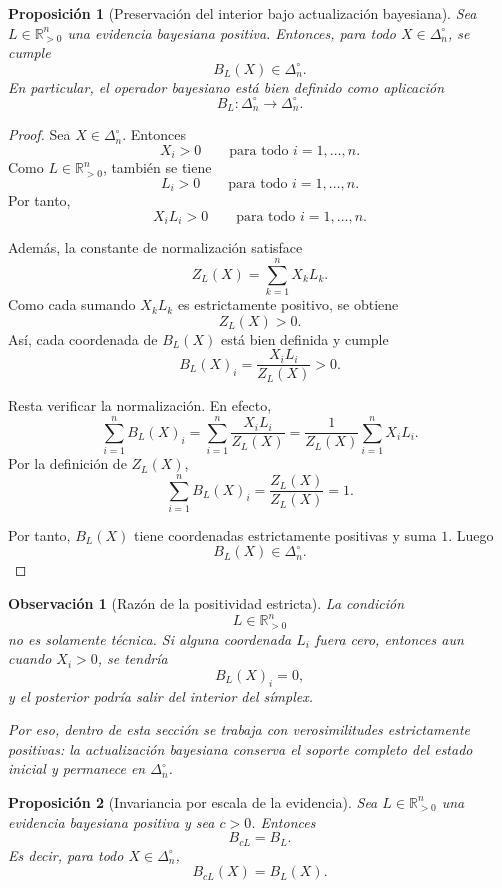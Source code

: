 \documentclass[12pt]{article}
\newtheorem{proposicion}{Proposición}[section]
\newtheorem{observacion}{Observación}[section]
\begin{document}
\begin{proposicion}[Preservación del interior bajo actualización bayesiana]
Sea \(L\in\mathbb{R}_{>0}^{n}\) una evidencia bayesiana positiva. Entonces,
para todo \(X\in\Delta_n^\circ\), se cumple
\[
B_L(X)\in\Delta_n^\circ.
\]
En particular, el operador bayesiano está bien definido como aplicación
\[
B_L:\Delta_n^\circ\longrightarrow \Delta_n^\circ.
\]
\end{proposicion}

\begin{proof}
Sea \(X\in\Delta_n^\circ\). Entonces
\[
X_i>0
\qquad
\text{para todo } i=1,\dots,n.
\]
Como \(L\in\mathbb{R}_{>0}^{n}\), también se tiene
\[
L_i>0
\qquad
\text{para todo } i=1,\dots,n.
\]
Por tanto,
\[
X_iL_i>0
\qquad
\text{para todo } i=1,\dots,n.
\]

Además, la constante de normalización satisface
\[
Z_L(X)
=
\sum_{k=1}^{n}X_kL_k.
\]
Como cada sumando \(X_kL_k\) es estrictamente positivo, se obtiene
\[
Z_L(X)>0.
\]
Así, cada coordenada de \(B_L(X)\) está bien definida y cumple
\[
B_L(X)_i
=
\frac{X_iL_i}{Z_L(X)}
>
0.
\]

Resta verificar la normalización. En efecto,
\[
\sum_{i=1}^{n}B_L(X)_i
=
\sum_{i=1}^{n}
\frac{X_iL_i}{Z_L(X)}
=
\frac{1}{Z_L(X)}
\sum_{i=1}^{n}X_iL_i.
\]
Por la definición de \(Z_L(X)\),
\[
\sum_{i=1}^{n}B_L(X)_i
=
\frac{Z_L(X)}{Z_L(X)}
=
1.
\]

Por tanto, \(B_L(X)\) tiene coordenadas estrictamente positivas y suma \(1\). Luego
\[
B_L(X)\in\Delta_n^\circ.
\]
\end{proof}

\begin{observacion}[Razón de la positividad estricta]
La condición
\[
L\in\mathbb{R}_{>0}^{n}
\]
no es solamente técnica. Si alguna coordenada \(L_i\) fuera cero, entonces aun cuando
\(X_i>0\), se tendría
\[
B_L(X)_i=0,
\]
y el posterior podría salir del interior del símplex.

Por eso, dentro de esta sección se trabaja con verosimilitudes estrictamente positivas:
la actualización bayesiana conserva el soporte completo del estado inicial y permanece en
\(\Delta_n^\circ\).
\end{observacion}

\begin{proposicion}[Invariancia por escala de la evidencia]
Sea \(L\in\mathbb{R}_{>0}^{n}\) una evidencia bayesiana positiva y sea
\(c>0\). Entonces
\[
B_{cL}=B_L.
\]
Es decir, para todo \(X\in\Delta_n^\circ\),
\[
B_{cL}(X)=B_L(X).
\]
\end{proposicion}
\end{document}
